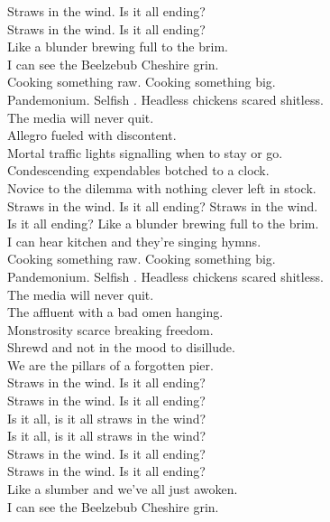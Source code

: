Straws in the wind. Is it all ending? \\
Straws in the wind. Is it all ending? \\
Like a blunder brewing full to the brim. \\
I can see the Beelzebub Cheshire grin. \\

Cooking something raw. Cooking something big. \\
Pandemonium. Selfish . Headless chickens scared shitless. \\
The media will never quit. \\

Allegro fueled with discontent. \\
Mortal traffic lights signalling when to stay or go. \\
Condescending expendables botched to a clock. \\
Novice to the dilemma with nothing clever left in stock. \\

Straws in the wind. Is it all ending? Straws in the wind. \\
Is it all ending? Like a blunder brewing full to the brim. \\
I can hear  kitchen and they're singing hymns. \\

Cooking something raw. Cooking something big. \\
Pandemonium. Selfish . Headless chickens scared shitless. \\
The media will never quit. \\

The affluent with a bad omen hanging. \\
Monstrosity scarce breaking freedom. \\
Shrewd and not in the mood to disillude. \\
We are the pillars of a forgotten pier. \\

Straws in the wind. Is it all ending? \\
Straws in the wind. Is it all ending? \\
Is it all, is it all straws in the wind? \\
Is it all, is it all straws in the wind? \\

Straws in the wind. Is it all ending? \\
Straws in the wind. Is it all ending? \\
Like a slumber and we've all just awoken. \\
I can see the Beelzebub Cheshire grin. \\

